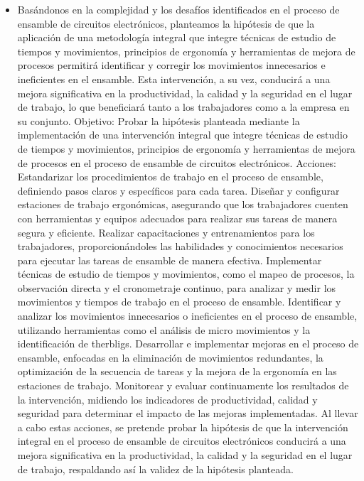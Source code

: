 \begin{itemize}
    \item Basándonos en la complejidad y los desafíos identificados en el proceso de ensamble de circuitos electrónicos, planteamos la hipótesis de que la aplicación de una metodología integral que integre técnicas de estudio de tiempos y movimientos, principios de ergonomía y herramientas de mejora de procesos permitirá identificar y corregir los movimientos innecesarios e ineficientes en el ensamble. Esta intervención, a su vez, conducirá a una mejora significativa en la productividad, la calidad y la seguridad en el lugar de trabajo, lo que beneficiará tanto a los trabajadores como a la empresa en su conjunto.
Objetivo:
Probar la hipótesis planteada mediante la implementación de una intervención integral que integre técnicas de estudio de tiempos y movimientos, principios de ergonomía y herramientas de mejora de procesos en el proceso de ensamble de circuitos electrónicos.
Acciones:
Estandarizar los procedimientos de trabajo en el proceso de ensamble, definiendo pasos claros y específicos para cada tarea.
Diseñar y configurar estaciones de trabajo ergonómicas, asegurando que los trabajadores cuenten con herramientas y equipos adecuados para realizar sus tareas de manera segura y eficiente.
Realizar capacitaciones y entrenamientos para los trabajadores, proporcionándoles las habilidades y conocimientos necesarios para ejecutar las tareas de ensamble de manera efectiva.
Implementar técnicas de estudio de tiempos y movimientos, como el mapeo de procesos, la observación directa y el cronometraje continuo, para analizar y medir los movimientos y tiempos de trabajo en el proceso de ensamble.
Identificar y analizar los movimientos innecesarios o ineficientes en el proceso de ensamble, utilizando herramientas como el análisis de micro movimientos y la identificación de therbligs.
Desarrollar e implementar mejoras en el proceso de ensamble, enfocadas en la eliminación de movimientos redundantes, la optimización de la secuencia de tareas y la mejora de la ergonomía en las estaciones de trabajo.\cite{book}
Monitorear y evaluar continuamente los resultados de la intervención, midiendo los indicadores de productividad, calidad y seguridad para determinar el impacto de las mejoras implementadas.
Al llevar a cabo estas acciones, se pretende probar la hipótesis de que la intervención integral en el proceso de ensamble de circuitos electrónicos conducirá a una mejora significativa en la productividad, la calidad y la seguridad en el lugar de trabajo, respaldando así la validez de la hipótesis planteada.
\end{itemize}
% 
% 
